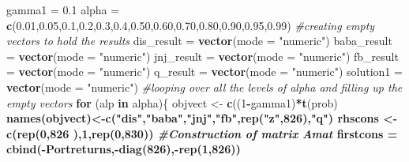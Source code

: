 \documentclass[]{article}
\newenvironment{Shaded}{\begin{snugshade}}{\end{snugshade}}
\newcommand{\KeywordTok}[1]{\textcolor[rgb]{0.13,0.29,0.53}{\textbf{#1}}}
\newcommand{\DataTypeTok}[1]{\textcolor[rgb]{0.13,0.29,0.53}{#1}}
\newcommand{\DecValTok}[1]{\textcolor[rgb]{0.00,0.00,0.81}{#1}}
\newcommand{\FloatTok}[1]{\textcolor[rgb]{0.00,0.00,0.81}{#1}}
\newcommand{\StringTok}[1]{\textcolor[rgb]{0.31,0.60,0.02}{#1}}
\newcommand{\CommentTok}[1]{\textcolor[rgb]{0.56,0.35,0.01}{\textit{#1}}}
\newcommand{\ControlFlowTok}[1]{\textcolor[rgb]{0.13,0.29,0.53}{\textbf{#1}}}
\newcommand{\OperatorTok}[1]{\textcolor[rgb]{0.81,0.36,0.00}{\textbf{#1}}}
\newcommand{\NormalTok}[1]{#1}
\begin{document}
\begin{Shaded}
\begin{Highlighting}[]
\NormalTok{gamma1 =}\StringTok{ }\FloatTok{0.1}
\NormalTok{alpha =}\StringTok{ }\KeywordTok{c}\NormalTok{(}\FloatTok{0.01}\NormalTok{,}\FloatTok{0.05}\NormalTok{,}\FloatTok{0.1}\NormalTok{,}\FloatTok{0.2}\NormalTok{,}\FloatTok{0.3}\NormalTok{,}\FloatTok{0.4}\NormalTok{,}\FloatTok{0.50}\NormalTok{,}\FloatTok{0.60}\NormalTok{,}\FloatTok{0.70}\NormalTok{,}\FloatTok{0.80}\NormalTok{,}\FloatTok{0.90}\NormalTok{,}\FloatTok{0.95}\NormalTok{,}\FloatTok{0.99}\NormalTok{)}
\CommentTok{#creating empty vectors to hold the results}
\NormalTok{dis_result =}\StringTok{ }\KeywordTok{vector}\NormalTok{(}\DataTypeTok{mode =} \StringTok{"numeric"}\NormalTok{)}
\NormalTok{baba_result =}\StringTok{ }\KeywordTok{vector}\NormalTok{(}\DataTypeTok{mode =} \StringTok{"numeric"}\NormalTok{)}
\NormalTok{jnj_result =}\StringTok{ }\KeywordTok{vector}\NormalTok{(}\DataTypeTok{mode =} \StringTok{"numeric"}\NormalTok{)}
\NormalTok{fb_result =}\StringTok{ }\KeywordTok{vector}\NormalTok{(}\DataTypeTok{mode =} \StringTok{"numeric"}\NormalTok{)}
\NormalTok{q_result =}\StringTok{ }\KeywordTok{vector}\NormalTok{(}\DataTypeTok{mode =} \StringTok{"numeric"}\NormalTok{)}
\NormalTok{solution1 =}\StringTok{ }\KeywordTok{vector}\NormalTok{(}\DataTypeTok{mode =} \StringTok{"numeric"}\NormalTok{)}
\CommentTok{#looping over all the levels of alpha and filling up the empty vectors}
\ControlFlowTok{for}\NormalTok{ (alp }\ControlFlowTok{in}\NormalTok{ alpha)\{}
\NormalTok{  objvect <-}\StringTok{ }\KeywordTok{c}\NormalTok{((}\DecValTok{1}\OperatorTok{-}\NormalTok{gamma1)}\OperatorTok{*}\KeywordTok{t}\NormalTok{(prob)}\OperatorTok{%
  \KeywordTok{names}\NormalTok{(objvect)<-}\KeywordTok{c}\NormalTok{(}\StringTok{"dis"}\NormalTok{,}\StringTok{"baba"}\NormalTok{,}\StringTok{"jnj"}\NormalTok{,}\StringTok{"fb"}\NormalTok{,}\KeywordTok{rep}\NormalTok{(}\StringTok{"z"}\NormalTok{,}\DecValTok{826}\NormalTok{),}\StringTok{"q"}\NormalTok{) }
\NormalTok{  rhscons <-}\StringTok{ }\KeywordTok{c}\NormalTok{(}\KeywordTok{rep}\NormalTok{(}\DecValTok{0}\NormalTok{,}\DecValTok{826}\NormalTok{ ),}\DecValTok{1}\NormalTok{,}\KeywordTok{rep}\NormalTok{(}\DecValTok{0}\NormalTok{,}\DecValTok{830}\NormalTok{))}
  \CommentTok{#Construction of matrix Amat}
\NormalTok{  firstcons =}\StringTok{ }\KeywordTok{cbind}\NormalTok{(}\OperatorTok{-}\NormalTok{Portreturns,}\OperatorTok{-}\KeywordTok{diag}\NormalTok{(}\DecValTok{826}\NormalTok{),}\OperatorTok{-}\KeywordTok{rep}\NormalTok{(}\DecValTok{1}\NormalTok{,}\DecValTok{826}\NormalTok{))}
}
\end{Highlighting}
\end{Shaded}
\end{document}
